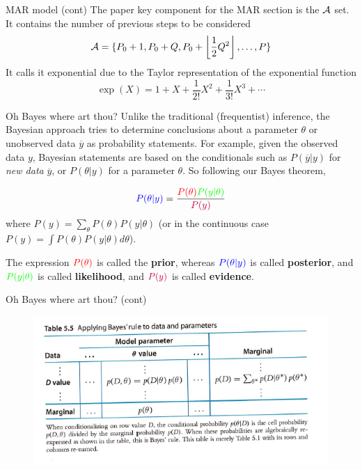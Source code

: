 \documentclass{beamer}
\begin{document}
	\begin{frame}{MAR model (cont)}
	The paper key component for the MAR section is the $\cal A$ set.
	It contains the number of previous steps to be considered
	\begin{equation}
		{\cal A}= \{ P_0 +1,P_0+Q , P_0+ \left\lfloor\frac{1}{2}Q^2\right\rfloor,\ldots,P\}
	\end{equation}
It calls it exponential due to the Taylor representation of the exponential function
\begin{equation*}
	\exp(X)= 1 + X + \frac{1}{2!}X^2 + \frac{1}{3!}X^3 + \cdots
\end{equation*}
	\end{frame}

\begin{frame}{Oh Bayes where art thou?}
	Unlike the traditional (frequentist) inference, the Bayesian approach tries to determine conclusions about a parameter $\theta$ or unobserved data $\overline{y}$ as probability statements.  For example, given the observed data $y$,  Bayesian statements are based on the conditionals such as  $P(\overline{y}|y)$ for {\it new data} $\overline{y}$, or $P(\theta|y)$ for a parameter $\theta$. So following our Bayes theorem,

\begin{equation}
	{\color{blue}P(\theta| y)}=\frac{{\color{red} P(\theta)} {\color{green}P(y|\theta)}}{\color{purple}P(y)}
	\label{eq:bayes2}
\end{equation}
where $P(y)= \sum_{\theta} P(\theta) P(y|\theta)$ (or in the continuous case $P(y)= \int P(\theta) P(y|\theta) d\theta$). 

The expression  $\color{red} P(\theta)$ is called the {\bf prior}, whereas  $\color{blue} P(\theta|y)$  is called {\bf posterior}, and $\color{green}P(y|\theta)$ is called {\bf likelihood}, and $\color{purple}P(y)$ is called {\bf evidence}. 

\end{frame}	

\begin{frame}{Oh Bayes where art thou? (cont)}
		\begin{figure}[h]
		\centering
			\includegraphics[scale=0.75]{../Figures/fig_bayes_table.png}
	\end{figure}
\end{frame}
\end{document}
